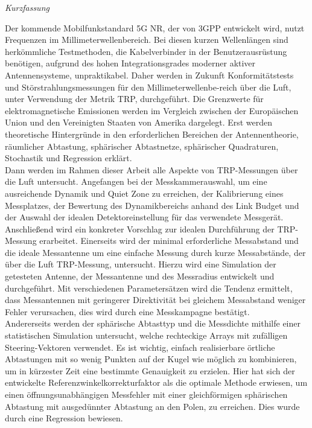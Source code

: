 

\newpage
\thispagestyle{empty}
\begin{center}
\Huge\emph{Kurzfassung}
\end{center}
\medskip
\noindent

Der kommende Mobilfunkstandard 5G NR, der von 3GPP entwickelt wird, nutzt Frequenzen im Millimeterwellenbereich.
Bei diesen kurzen Wellenlängen sind herkömmliche Testmethoden, die Kabelverbinder in der Benutzerausrüstung benötigen, aufgrund des hohen Integrationsgrades moderner aktiver Antennensysteme, unpraktikabel.
Daher werden in Zukunft Konformitätstests und Störstrahlungsmessungen für den Millimeterwellenbe-reich über die Luft, unter Verwendung der Metrik TRP, durchgeführt.
Die Grenzwerte für elektromagnetische Emissionen werden im Vergleich zwischen der Europäischen Union und den Vereinigten Staaten von Amerika dargelegt.
Erst werden theoretische Hintergründe in den erforderlichen Bereichen der Antennentheorie, räumlicher Abtastung, sphärischer Abtastnetze, sphärischer Quadraturen, Stochastik und Regression erklärt.\\

Dann werden im Rahmen dieser Arbeit alle Aspekte von TRP-Messungen über die Luft untersucht.
Angefangen bei der Messkammerauswahl, um eine ausreichende Dynamik und Quiet Zone zu erreichen, der Kalibrierung eines Messplatzes, der Bewertung des Dynamikbereichs anhand des Link Budget und der Auswahl der idealen Detektoreinstellung für das verwendete Messgerät.
Anschließend wird ein konkreter Vorschlag zur idealen Durchführung der TRP-Messung erarbeitet.
Einerseits wird der minimal erforderliche Messabstand und die ideale Messantenne um eine einfache Messung durch kurze Messabstände, der über die Luft TRP-Messung, untersucht.
Hierzu wird eine Simulation der getesteten Antenne, der Messantenne und des Messradius entwickelt und durchgeführt.
Mit verschiedenen Parametersätzen wird die Tendenz ermittelt, dass Messantennen mit geringerer Direktivität bei gleichem Messabstand weniger Fehler verursachen, dies wird durch eine Messkampagne bestätigt.\\

Andererseits werden der sphärische Abtasttyp und die Messdichte mithilfe einer statistischen Simulation untersucht, welche rechteckige Arrays mit zufälligen Steering-Vektoren verwendet.
Es ist wichtig, einfach realisierbare örtliche Abtastungen mit so wenig Punkten auf der Kugel wie möglich zu kombinieren, um in kürzester Zeit eine bestimmte Genauigkeit zu erzielen.
Hier hat sich der entwickelte Referenzwinkelkorrekturfaktor als die optimale Methode erwiesen, um einen öffnungsunabhängigen Messfehler mit einer gleichförmigen sphärischen Abtastung mit ausgedünnter Abtastung an den Polen, zu erreichen.
Dies wurde durch eine Regression bewiesen.
